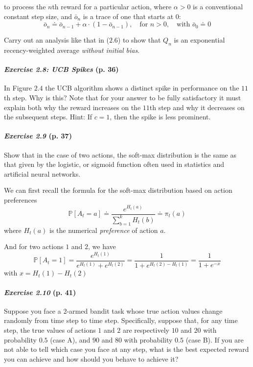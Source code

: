 \documentclass[10pt,a4paper]{article}
\begin{document}
to process the $n$th reward for a particular action, where $\alpha > 0$ is a conventional constant step size, and $\bar{o}_n$ is a trace of one that starts at $0$:
\begin{equation}
\bar{o}_n \doteq \bar{o}_{n-1} + \alpha \cdot (1 - \bar{o}_{n-1}),\quad \textrm{for } n > 0,\quad \textrm{with } \bar{o}_0 \doteq 0
\end{equation}

Carry out an analysis like that in ($2.6$) to show that $Q_n$ is an exponential recency-weighted average \textit{without initial bias}.

\paragraph{\textit{Exercise 2.8: UCB Spikes} (p. 36)} In Figure $2.4$ the UCB algorithm shows a distinct spike
in performance on the $11$th step. Why is this? Note that for your answer to be fully satisfactory it must explain both why the reward increases on the $11$th step and why it decreases on the subsequent steps. Hint: If $c = 1$, then the spike is less prominent.

\paragraph{\textit{Exercise 2.9} (p. 37)} Show that in the case of two actions, the soft-max distribution is the same
as that given by the logistic, or sigmoid function often used in statistics and artificial
neural networks.

\bigskip
We can first recall the formula for the soft-max distribution based on action preferences
\begin{equation}
\mathbb{P}[A_t = a] \doteq \frac{e^{H_t(a)}}{\sum_{b=1}^k H_t(b)} \doteq \pi_t(a)
\end{equation}
where $H_t(a)$ is the numerical \textit{preference} of action $a$.

And for two actions $1$ and $2$, we have
\begin{equation}
\mathbb{P}[A_t = 1] = \frac{e^{H_t(1)}}{ e^{H_t(1)} + e^{H_t(2)}} = \frac{1}{1 +  e^{H_t(2) -  H_t(1)}} = \frac{1}{1 +  e^{-x}}
\end{equation}
with $x = H_t(1)- H_t(2)$

\paragraph{\textit{Exercise 2.10} (p. 41)} Suppose you face a $2$-armed bandit task whose true action values change randomly from time step to time step. Specifically, suppose that, for any time step, the true values of actions $1$ and $2$ are respectively $10$ and $20$ with probability $0.5$ (case
A), and $90$ and $80$ with probability $0.5$ (case B). If you are not able to tell which case you face at any step, what is the best expected reward you can achieve and how should you behave to achieve it?
\end{document}
